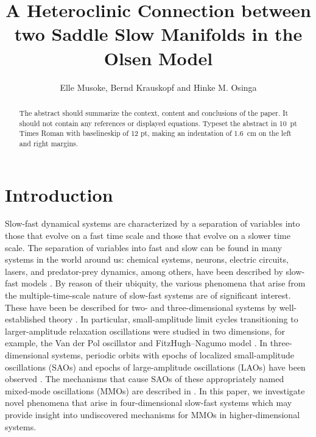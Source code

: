 \documentclass{ws-ijbc}
\begin{document}
\catchline{}{}{}{}{} %


\title{A Heteroclinic Connection between two Saddle Slow Manifolds in the Olsen Model}

\author{Elle Musoke, Bernd Krauskopf and Hinke M. Osinga}

\address{Department of Mathematics, University of Auckland, Private Bag 92019\\
Auckland, 1142, New Zealand\\
elle.musoke@auckland.ac.nz}

\maketitle

\begin{history}
\end{history}

\begin{abstract}
The abstract should summarize the context, content and conclusions
of the paper. It should not contain any references or displayed
equations. Typeset the abstract in 10~pt Times Roman with
baselineskip of 12 pt, making an indentation of 1.6~cm on the left
and right margins.
\end{abstract}

\section{Introduction}

Slow-fast dynamical systems are characterized by a separation of variables into those that evolve on a fast time scale and those that evolve on a slower time scale.  The separation of variables into fast and slow can be found in many systems in the world around us: chemical systems, neurons, electric circuits, lasers, and predator-prey dynamics, among others, have been described by slow-fast models  \cite{BZ_reaction, Neurons,Circuits, lasers, Predator-Prey}.  By reason of their ubiquity, the various phenomena that arise from the multiple-time-scale nature of slow-fast systems are of significant interest. These have been be described for two- and three-dimensional systems by well-established theory \cite{canard_explosion, lents-rapides, enlacement,singular_hopf, folded_node,three}.  In particular, small-amplitude limit cycles transitioning to larger-amplitude relaxation oscillations were studied in two dimensions, for example, the Van der Pol oscillator and FitzHugh--Nagumo model \cite{canard_explosion, fitz-hugh-nagumo}.  In three-dimensional systems, periodic orbits with epochs of localized small-amplitude oscillations (SAOs) and epochs of large-amplitude oscillations (LAOs) have been observed \cite{BZ}.  The mechanisms that cause SAOs of these appropriately named mixed-mode oscillations (MMOs) are described in \cite{MMO}.  In this paper, we investigate novel phenomena that arise in four-dimensional slow-fast systems which may provide insight into undiscovered mechanisms for MMOs in higher-dimensional systems.
\end{document}
